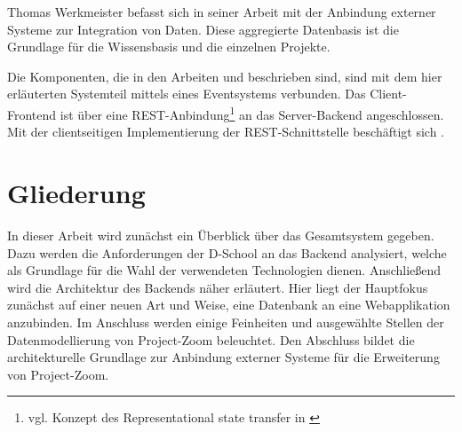 Thomas Werkmeister befasst sich in seiner Arbeit \cite{bp-tewe} mit der Anbindung externer Systeme zur Integration von Daten. Diese aggregierte Datenbasis ist die Grundlage für die Wissensbasis und die einzelnen Projekte.

Die Komponenten, die in den Arbeiten \cite{bp-tewe} und \cite{bp-dome} beschrieben sind, sind mit dem hier erläuterten Systemteil mittels eines Eventsystems verbunden. Das Client-Frontend ist über eine REST-Anbindung\footnote{vgl. Konzept des Representational state transfer in \cite{rest}} an das Server-Backend angeschlossen. Mit der clientseitigen Implementierung der REST-Schnittstelle beschäftigt sich \cite{bp-norman}.

\section{Gliederung}
In dieser Arbeit wird zunächst ein Überblick über das Gesamtsystem gegeben. Dazu werden die Anforderungen der D-School an das Backend analysiert, welche als Grundlage für die Wahl der verwendeten Technologien dienen. Anschließend wird die Architektur des Backends näher erläutert. Hier liegt der Hauptfokus zunächst auf einer neuen Art und Weise, eine Datenbank an eine Webapplikation anzubinden. Im Anschluss werden einige Feinheiten und ausgewählte Stellen der Datenmodellierung von Project-Zoom beleuchtet. Den Abschluss bildet die architekturelle Grundlage zur Anbindung externer Systeme für die Erweiterung von Project-Zoom.

